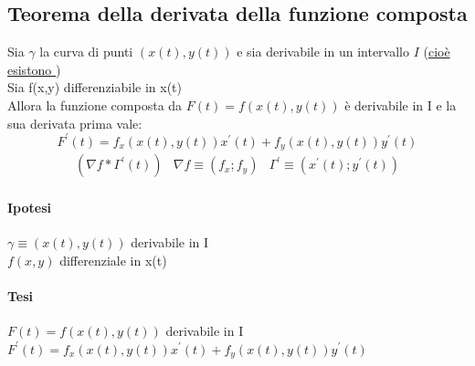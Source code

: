 \subsection{Teorema della derivata della funzione composta}
\begin{defi}
	Sia $\gamma$ la curva di punti $(x(t),y(t))$ e sia derivabile in un
	intervallo $I$ (\underline{cioè esistono })\\
	Sia f(x,y) differenziabile in x(t)\\
	Allora la funzione composta da $F(t)=f(x(t),y(t))$ è derivabile in I e la
	sua derivata prima vale:
	\begin{equation}
		F^\prime (t)=f_x(x(t),y(t))x^\prime(t)+f_y(x(t),y(t))y^\prime(t)
	\end{equation}
	\begin{equation*}
		\begin{matrix}
			(\nabla f *\Gamma^\prime (t)) & \nabla f \equiv (f_x;f_y) &
			\Gamma^\prime \equiv(x^\prime (t); y^\prime (t))
		\end{matrix}
	\end{equation*}
	\begin{multicols}{2}
		\paragraph{Ipotesi}
			$\gamma \equiv (x(t),y(t))$ derivabile in I\\
			$f(x,y)$ differenziale in x(t)
		\paragraph{Tesi}
		$F(t)=f(x(t),y(t))$ derivabile in I\\
		$F^\prime(t)=f_x(x(t),y(t))x^\prime(t)+f_y(x(t),y(t))y^\prime (t)$
	\end{multicols}
\end{defi}
